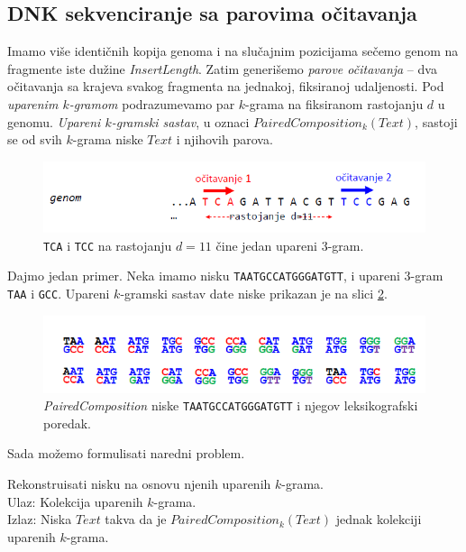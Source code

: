\subsection{DNK sekvenciranje sa parovima očitavanja} 

Imamo više identičnih kopija genoma i na slučajnim pozicijama sečemo genom na fragmente iste dužine \textit{InsertLength}. Zatim generišemo \emph{parove očitavanja} -- dva očitavanja sa krajeva svakog fragmenta na jednakoj, fiksiranoj udaljenosti. Pod \emph{uparenim $k$-gramom} podrazumevamo par $k$-grama na fiksiranom rastojanju $d$ u genomu. \emph{Upareni $k$-gramski sastav}, u oznaci $PairedComposition_k(Text)$, sastoji se od svih $k$-grama niske $Text$ i njihovih parova.

\begin{figure}[h]
	\centering
	\includegraphics[width=1\textwidth]{poglavlja/3/slike/upareni_kgram.png}
	\caption{\texttt{TCA} i \texttt{TCC} na rastojanju $d=11$ čine jedan upareni 3-gram.}
	\label{slika:upareni}
\end{figure} 

Dajmo jedan primer. Neka imamo nisku \texttt{TAATGCCATGGGATGTT}, i upareni 3-gram \texttt{TAA} i \texttt{GCC}. Upareni $k$-gramski sastav date niske prikazan je na slici \ref{slika:upareni3}.

\begin{figure}[h]
	\centering
	\includegraphics[width=1\textwidth]{poglavlja/3/slike/upareni_3gram.png}
	\caption{\emph{PairedComposition} niske \texttt{TAATGCCATGGGATGTT} i njegov leksikografski poredak.}
	\label{slika:upareni3}
\end{figure} 

Sada mo\v zemo formulisati naredni problem.

\begin{problem}
	Rekonstruisati nisku na osnovu njenih uparenih $k$-grama. \\
	Ulaz: Kolekcija uparenih $k$-grama. \\
	Izlaz: Niska $Text$ takva da je $PairedComposition_k(Text)$ jednak kolekciji uparenih $k$-grama. 
\end{problem}

